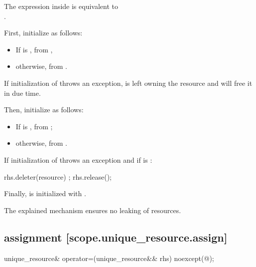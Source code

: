 \documentclass[ebook,11pt,article]{memoir}
\begin{document}
\begin{itemdescr}
\pnum
\remarks
The expression inside  is equivalent to \\
 \tcode{\&\&} .

\pnum
\effects First, initialize  as follows: 
\begin{itemize}
\item If  is , from , 
\item otherwise, from .  
\end{itemize}

\pnum
\begin{note}
If initialization of  throws an exception,  is left owning the resource and will free it in due time.
\end{note}

\pnum
Then, initialize  as follows: 
\begin{itemize}
\item If  is , 
from ;
\item otherwise, 
from . 
\end{itemize}

\pnum
If initialization of  throws an exception and 
if  is :
\begin{codeblock}
    rhs.deleter(resource) ; rhs.release();
\end{codeblock}

\pnum
Finally,  is initialized with .

\pnum
\begin{note}
The explained mechanism ensures no leaking of resources.
\end{note}
\end{itemdescr}

\subsection { assignment [scope.unique_resource.assign]}

\begin{itemdecl}
unique_resource& operator=(unique_resource&& rhs) noexcept(@\seebelow@);
\end{itemdecl}
\end{document}
